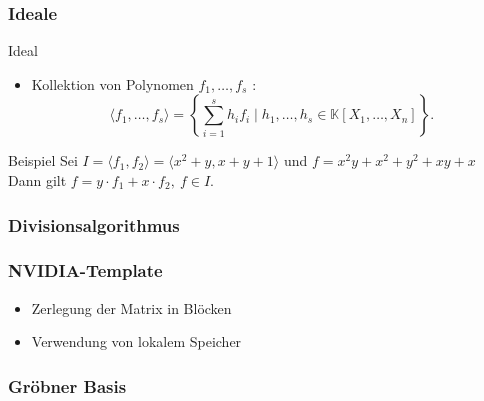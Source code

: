 \documentclass{beamer}
\begin{document}
\begin{frame}[fragile]
\frametitle{Ideale}

\begin{block}{Ideal }
\begin{itemize}
\item Kollektion von Polynomen $f_{1}, \dots , f_{s}$ : \\
\[ \langle f_{1}, \dots , f_{s} \rangle = \left\lbrace  \sum_{i=1}^s h_{i}f_{i} \mid h_{1}, \dots , h_{s} \in \mathbb{K}\left[X_{1}, \dots, X_{n}\right] \right\rbrace. \] 
 
\end{itemize}

\end{block}

\begin{block}{Beispiel}
Sei $ I= \langle f_{1},f_{2} \rangle = \langle x^{2}+y, x+y+1 \rangle $ und $f=x^{2}y+x^{2}+y^{2}+xy+x$ \\
Dann gilt $f= y \cdot f_{1} + x \cdot f_{2},~f\in I$.

\end{block}


\end{frame}

\begin{frame}
\frametitle{Divisionsalgorithmus}




	
\end{frame}


\begin{frame}[fragile]
\frametitle{NVIDIA-Template}

\begin{itemize}
\item
Zerlegung der Matrix in Bl\"ocken
\item
Verwendung von lokalem Speicher 
\end{itemize}





\end{frame}


\begin{frame}[fragile]
\frametitle{Gröbner Basis}


\end{frame}
\end{document}
